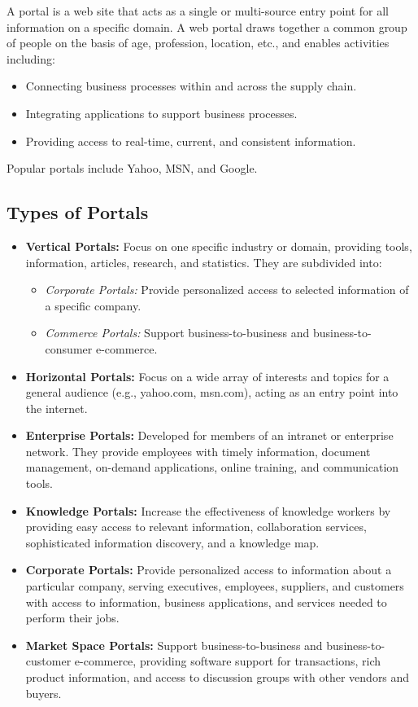 \documentclass[12pt,a4paper]{article}
\begin{document}
A portal is a web site that acts as a single or multi-source entry point for all information on a specific domain. A web portal draws together a common group of people on the basis of age, profession, location, etc., and enables activities including:
\begin{itemize}
    \item Connecting business processes within and across the supply chain.
    \item Integrating applications to support business processes.
    \item Providing access to real-time, current, and consistent information.
\end{itemize}
Popular portals include Yahoo, MSN, and Google.

\subsection{Types of Portals}

\begin{itemize}
    \item \textbf{Vertical Portals:} Focus on one specific industry or domain, providing tools, information, articles, research, and statistics. They are subdivided into:
    \begin{itemize}
        \item \textit{Corporate Portals:} Provide personalized access to selected information of a specific company.
        \item \textit{Commerce Portals:} Support business-to-business and business-to-consumer e-commerce.
    \end{itemize}
    \item \textbf{Horizontal Portals:} Focus on a wide array of interests and topics for a general audience (e.g., yahoo.com, msn.com), acting as an entry point into the internet.
    \item \textbf{Enterprise Portals:} Developed for members of an intranet or enterprise network. They provide employees with timely information, document management, on-demand applications, online training, and communication tools.
    \item \textbf{Knowledge Portals:} Increase the effectiveness of knowledge workers by providing easy access to relevant information, collaboration services, sophisticated information discovery, and a knowledge map.
    \item \textbf{Corporate Portals:} Provide personalized access to information about a particular company, serving executives, employees, suppliers, and customers with access to information, business applications, and services needed to perform their jobs.
    \item \textbf{Market Space Portals:} Support business-to-business and business-to-customer e-commerce, providing software support for transactions, rich product information, and access to discussion groups with other vendors and buyers.
\end{itemize}
\end{document}
